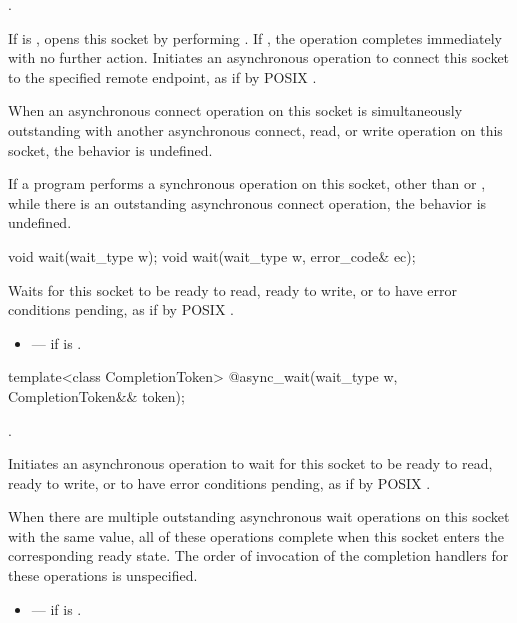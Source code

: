 \begin{itemdescr}
\pnum
\completionsig {}.

\pnum
\effects If  is , opens this socket by performing . If , the operation completes immediately with no further action. Initiates an asynchronous operation to connect this socket to the specified remote endpoint, as if by POSIX .

\pnum
 When an asynchronous connect operation on this socket is simultaneously outstanding with another asynchronous connect, read, or write operation on this socket, the behavior is undefined.

\pnum
If a program performs a synchronous operation on this socket, other than  or , while there is an outstanding asynchronous connect operation, the behavior is undefined.
\end{itemdescr}

\begin{itemdecl}
void wait(wait_type w);
void wait(wait_type w, error_code& ec);
\end{itemdecl}

\begin{itemdescr}
\pnum
\effects Waits for this socket to be ready to read, ready to write, or to have error conditions pending, as if by POSIX .

\pnum
\errors
\begin{itemize}
\item
{} --- if  is .
\end{itemize}
\end{itemdescr}

\begin{itemdecl}
template<class CompletionToken>
  @\DEDUCED@ async_wait(wait_type w, CompletionToken&& token);
\end{itemdecl}

\begin{itemdescr}
\pnum
\completionsig {}.

\pnum
\effects Initiates an asynchronous operation to wait for this socket to be ready to read, ready to write, or to have error conditions pending, as if by POSIX .

\pnum
When there are multiple outstanding asynchronous wait operations on this socket with the same  value, all of these operations complete when this socket enters the corresponding ready state. The order of invocation of the completion handlers for these operations is unspecified.

\pnum
\errors
\begin{itemize}
\item
{} --- if  is .
\end{itemize}
\end{itemdescr}




